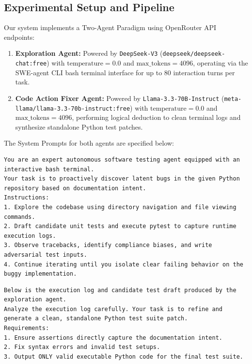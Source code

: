 \documentclass[conference]{IEEEtran}
\begin{document}
\subsection{Experimental Setup and Pipeline}
\label{subsec:setup}
Our system implements a Two-Agent Paradigm using OpenRouter API endpoints:
\begin{enumerate}
    \item \textbf{Exploration Agent:} Powered by \texttt{DeepSeek-V3} (\texttt{deepseek/deepseek-chat:free}) with $\text{temperature}=0.0$ and $\text{max\_tokens}=4096$, operating via the SWE-agent CLI bash terminal interface for up to 80 interaction turns per task.
    \item \textbf{Code Action Fixer Agent:} Powered by \texttt{Llama-3.3-70B-Instruct} (\texttt{meta-llama/llama-3.3-70b-instruct:free}) with $\text{temperature}=0.0$ and $\text{max\_tokens}=4096$, performing logical deduction to clean terminal logs and synthesize standalone Python test patches.
\end{enumerate}

The System Prompts for both agents are specified below:

\begin{lstlisting}[caption={System Prompt for Exploration Agent}, label={lst:prompt_explore}]
You are an expert autonomous software testing agent equipped with an interactive bash terminal.
Your task is to proactively discover latent bugs in the given Python repository based on documentation intent.
Instructions:
1. Explore the codebase using directory navigation and file viewing commands.
2. Draft candidate unit tests and execute pytest to capture runtime execution logs.
3. Observe tracebacks, identify compliance biases, and write adversarial test inputs.
4. Continue iterating until you isolate clear failing behavior on the buggy implementation.
\end{lstlisting}

\begin{lstlisting}[caption={System Prompt for Code Action Fixer Agent}, label={lst:prompt_fixer}]
Below is the execution log and candidate test draft produced by the exploration agent.
Analyze the execution log carefully. Your task is to refine and generate a clean, standalone Python test suite patch.
Requirements:
1. Ensure assertions directly capture the documentation intent.
2. Fix syntax errors and invalid test setups.
3. Output ONLY valid executable Python code for the final test suite.
\end{lstlisting}
\end{document}
